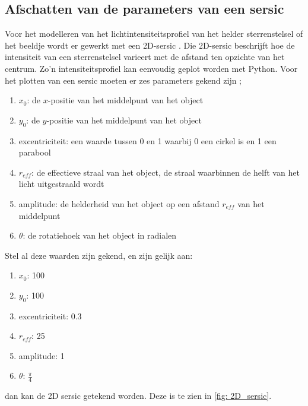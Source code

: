 \subsection{Afschatten van de parameters van een sersic}
Voor het modelleren van het lichtintensiteitsprofiel van het helder sterrenstelsel of het beeldje wordt er gewerkt met een 2D-sersic
\cite{unknown-author-no-date-sersic}
\cite{wikipedia-contributors-2024}. Die 2D-sersic beschrijft hoe de intensiteit van een sterrenstelsel varieert met de afstand ten opzichte van het centrum. Zo'n intensiteitsprofiel kan eenvoudig geplot worden met Python. Voor het plotten van een sersic moeten er zes parameters gekend zijn \cite{unknown-author-no-date-info-sersic};
\begin{enumerate}
    \item $x_{0}$: de $x$-positie van het middelpunt van het object
    \item $y_{0}$: de $y$-positie van het middelpunt van het object
    \item excentriciteit: een waarde tussen 0 en 1 waarbij 0 een cirkel is en 1 een parabool
    \item $r_{eff}$: de effectieve straal van het object, de straal waarbinnen de helft van het licht uitgestraald wordt \cite{wikipedia-contributors-2023-reff}
    \item amplitude: de helderheid van het object op een afstand $r_{eff}$ van het middelpunt
    \item $\theta$: de rotatiehoek van het object in radialen
\end{enumerate}
Stel al deze waarden zijn gekend, en zijn gelijk aan:
\begin{enumerate}
    \item $x_{0}$: 100
    \item $y_{0}$: 100
    \item excentriciteit: 0.3  
    \item $r_{eff}$: 25
    \item amplitude: 1
    \item $\theta$: $\frac{\pi}{4}$
\end{enumerate}
dan kan de 2D sersic getekend worden. Deze is te zien in \cref{fig: 2D_sersic}.
